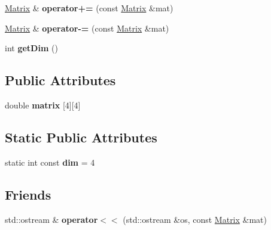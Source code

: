 \begin{DoxyCompactItemize}
\item 
\hypertarget{class_matrix_a925081e50122da1db2fe6a200035f665}{
\hyperlink{class_matrix}{Matrix} \& {\bfseries operator+=} (const \hyperlink{class_matrix}{Matrix} \&mat)}
\label{class_matrix_a925081e50122da1db2fe6a200035f665}

\item 
\hypertarget{class_matrix_aa4364ebd7bb6a94176c7b7a79ab42c16}{
\hyperlink{class_matrix}{Matrix} \& {\bfseries operator-\/=} (const \hyperlink{class_matrix}{Matrix} \&mat)}
\label{class_matrix_aa4364ebd7bb6a94176c7b7a79ab42c16}

\item 
\hypertarget{class_matrix_a3507ab550914cdd7170e138a0cbd823a}{
int {\bfseries getDim} ()}
\label{class_matrix_a3507ab550914cdd7170e138a0cbd823a}

\end{DoxyCompactItemize}
\subsection*{Public Attributes}
\begin{DoxyCompactItemize}
\item 
\hypertarget{class_matrix_a7262fb79344386da3983a61a0074f754}{
double {\bfseries matrix} \mbox{[}4\mbox{]}\mbox{[}4\mbox{]}}
\label{class_matrix_a7262fb79344386da3983a61a0074f754}

\end{DoxyCompactItemize}
\subsection*{Static Public Attributes}
\begin{DoxyCompactItemize}
\item 
\hypertarget{class_matrix_a44f940fc5a7552347943f5e3c9c96b8f}{
static int const {\bfseries dim} = 4}
\label{class_matrix_a44f940fc5a7552347943f5e3c9c96b8f}

\end{DoxyCompactItemize}
\subsection*{Friends}
\begin{DoxyCompactItemize}
\item 
\hypertarget{class_matrix_a6c0087f550d6b94e3b9d6d7bf0e846a6}{
std::ostream \& {\bfseries operator$<$$<$} (std::ostream \&os, const \hyperlink{class_matrix}{Matrix} \&mat)}
\label{class_matrix_a6c0087f550d6b94e3b9d6d7bf0e846a6}

\end{DoxyCompactItemize}


